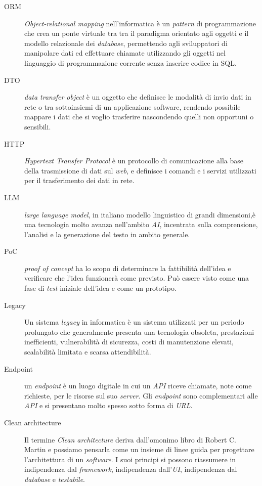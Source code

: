 \begin{description}
  \item[\hypertarget{gls:ORM}{ORM}] \textit{Object-relational mapping} nell'informatica è un \textit{pattern} di programmazione che crea un ponte virtuale tra tra il paradigma orientato agli oggetti e il modello relazionale dei \textit{database}, permettendo agli sviluppatori di manipolare dati ed effettuare chiamate utilizzando gli oggetti nel linguaggio di programmazione corrente senza inserire codice in SQL. 
  
  \item[\hypertarget{gls:DTO}{DTO}] \textit{data transfer object} è un oggetto che definisce le modalità di invio dati in rete o tra sottoinsiemi di un applicazione software, rendendo possibile mappare i dati che si voglio trasferire nascondendo quelli non opportuni o sensibili. 
  
  \item[\hypertarget{gls:HTTP}{HTTP}] \textit{Hypertext Transfer Protocol} è un protocollo di comunicazione alla base della trasmissione di dati sul \textit{web}, e definisce i comandi e i servizi utilizzati per il trasferimento dei dati in rete.
   
  
  \item[\hypertarget{gls:LLM}{LLM}] \textit{large language model}, in italiano modello linguistico di grandi dimensioni,è una tecnologia molto avanza nell'ambito \textit{AI}, incentrata sulla comprensione, l'analisi e la generazione del testo in ambito generale.
   
  
  \item[\hypertarget{gls:PoC}{PoC}] \textit{proof of concept} ha lo scopo di determinare la fattibilità dell'idea e verificare che l'idea funzionerà come previsto. Può essere visto come una fase di \textit{test} iniziale dell'idea e come un prototipo.

  
  \item[\hypertarget{gls:legacy}{Legacy}]  Un sistema \textit{legacy} in informatica è un sistema utilizzati per un periodo prolungato che generalmente presenta una tecnologia obsoleta, prestazioni inefficienti, vulnerabilità di sicurezza, costi di manutenzione elevati, scalabilità limitata e scarsa attendibilità.
  
  
  \item[\hypertarget{gls:endpoint}{Endpoint}] un \textit{endpoint} è un luogo digitale in cui un \textit{API} riceve chiamate, note come richieste, per le risorse sul suo \textit{server}. Gli \textit{endpoint} sono complementari alle \textit{API} e si presentano molto spesso sotto forma di \textit{URL}.
  
  
  \item[\hypertarget{gls:Clean architecture}{Clean architecture}] Il termine \textit{Clean architecture} deriva dall'omonimo libro di Robert C. Martin e possiamo pensarla come un insieme di linee guida per progettare l'architettura di un \textit{software}. I suoi principi si possono riassumere in indipendenza dal \textit{framework}, indipendenza dall'\textit{UI}, indipendenza dal \textit{database} e \textit{testabile}.
  
\end{description}

\cleardoublepage
{}
